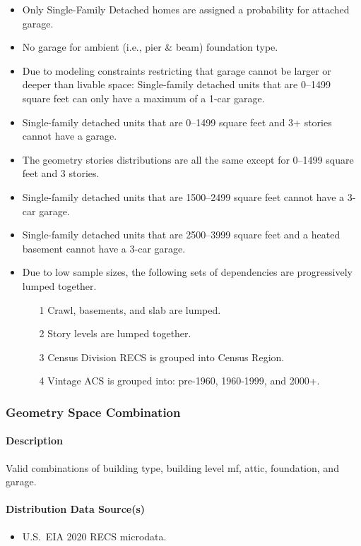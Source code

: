 \begin{itemize}
    \item Only Single-Family Detached homes are assigned a probability for attached garage.
    \item No garage for ambient (i.e., pier \& beam) foundation type.
    \item Due to modeling constraints restricting that garage cannot be larger or deeper than livable space: Single-family detached units that are 0--1499 square feet can only have a maximum of a 1-car garage.
    \item Single-family detached units that are 0--1499 square feet and 3+ stories cannot have a garage.
    \item The geometry stories distributions are all the same except for 0--1499 square feet and 3 stories.
    \item Single-family detached units that are 1500--2499 square feet cannot have a 3-car garage.
    \item Single-family detached units that are 2500--3999 square feet and a heated basement cannot have a 3-car garage. 
    \item Due to low sample sizes, the following sets of dependencies are progressively lumped together. 
    \begin{itemize}
    \item [1] Crawl, basements, and slab are lumped.
    \item [2] Story levels are lumped together.
    \item [3] Census Division RECS is grouped into Census Region.
    \item [4] Vintage ACS is grouped into: pre-1960, 1960-1999, and 2000+.
    \end{itemize}
\end{itemize}

\subsubsection{Geometry Space Combination}
\paragraph{Description}
Valid combinations of building type, building level mf, attic, foundation, and garage.

\paragraph{Distribution Data Source(s)}
\begin{itemize}
    \item U.S.~EIA 2020 RECS microdata.
\end{itemize}

